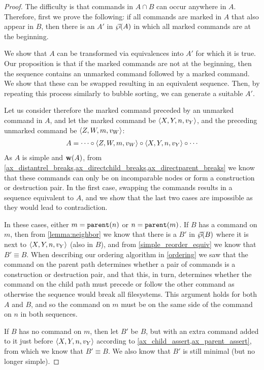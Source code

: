 \begin{proof}
The difficulty is that commands in $A\cap B$ can occur anywhere in $A$.
Therefore, first we prove the following:
if all commands are marked in $A$ that also appear in $B$,
then there is an $A'$ in $\vec{\wp}({A})$ in which all marked commands are at the beginning.

We show that $A$ can be transformed via equivalences into $A'$ for which it is true.
Our proposition is that if the marked commands are not at the beginning, then
the sequence contains an unmarked command followed by a marked command.
We show that these can be swapped resulting in an equivalent sequence.
Then, by repeating this process similarly to bubble sorting, we can generate 
a suitable $A'$.

Let us consider therefore the marked command preceded by an unmarked command in $A$,
and let the marked command be $\langle{X,Y,n,v_Y}\rangle$, 
and the preceding unmarked command be $\langle{Z,W,m,v_W}\rangle$:
\begin{gather*}
A = \cdots\circ  \langle{Z,W,m,v_W}\rangle\circ  \langle{X,Y,n,v_Y}\rangle\circ  \cdots
\end{gather*}
As $A$ is simple and $\mathbf{w}({A})$, from 
\cref{ax_distantrel_breaks,ax_directchild_breaks,ax_directparent_breaks}
we know that these commands can only be on incomparable nodes or form a construction or destruction pair.
In the first case, swapping the commands results in a sequence equivalent to $A$,
and we show that the last two cases are impossible as they would lead to contradiction.

In these cases, either $m=\mathtt{parent}(n)$ or $n=\mathtt{parent}(m)$.
If $B$ has a command on $m$, then
from \cref{lemma:neighbor}
we know that there is a $B'$ in $\vec{\wp}({B})$ where it is next to $\langle{X,Y,n,v_Y}\rangle$ (also in $B$),
and from \cref{simple_reorder_equiv} we know that $B'\equiv B$.
When describing our ordering algorithm in \cref{ordering} we saw
that the command on the parent path determines whether a pair of commands
is a construction or destruction pair,
and that this, in turn, determines whether the command on the child path must
precede or follow the other command as otherwise the sequence would break all filesystems.
This argument holds for both $A$ and $B$, and so the command on $m$ must be on
the same side of the command on $n$ in both sequences.

If $B$ has no command on $m$, then let $B'$ be $B$, 
but with an extra command added to it just before $\langle{X,Y,n,v_Y}\rangle$
according to \cref{ax_child_assert,ax_parent_assert}, 
from which we know that $B'\equiv B$.
We also know that $B'$ is still minimal (but no longer simple).


\end{proof}
